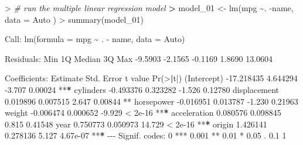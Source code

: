 \documentclass[
]{article}
\newenvironment{Shaded}{\begin{snugshade}}{\end{snugshade}}
\newcommand{\AttributeTok}[1]{\textcolor[rgb]{0.77,0.63,0.00}{#1}}
\newcommand{\CommentTok}[1]{\textcolor[rgb]{0.56,0.35,0.01}{\textit{#1}}}
\newcommand{\DecValTok}[1]{\textcolor[rgb]{0.00,0.00,0.81}{#1}}
\newcommand{\ErrorTok}[1]{\textcolor[rgb]{0.64,0.00,0.00}{\textbf{#1}}}
\newcommand{\FloatTok}[1]{\textcolor[rgb]{0.00,0.00,0.81}{#1}}
\newcommand{\FunctionTok}[1]{\textcolor[rgb]{0.00,0.00,0.00}{#1}}
\newcommand{\NormalTok}[1]{#1}
\newcommand{\OtherTok}[1]{\textcolor[rgb]{0.56,0.35,0.01}{#1}}
\newcommand{\SpecialCharTok}[1]{\textcolor[rgb]{0.00,0.00,0.00}{#1}}
\newcommand{\StringTok}[1]{\textcolor[rgb]{0.31,0.60,0.02}{#1}}
\begin{document}
\begin{Shaded}
\begin{Highlighting}[]
\SpecialCharTok{\textgreater{}} \CommentTok{\# run the multiple linear regression model}
\ErrorTok{\textgreater{}}\NormalTok{ model\_01 }\OtherTok{\textless{}{-}} \FunctionTok{lm}\NormalTok{(mpg }\SpecialCharTok{\textasciitilde{}}\NormalTok{. }\SpecialCharTok{{-}}\NormalTok{name, }\AttributeTok{data =}\NormalTok{ Auto )}
\SpecialCharTok{\textgreater{}} \FunctionTok{summary}\NormalTok{(model\_01)}

\NormalTok{Call}\SpecialCharTok{:}
\FunctionTok{lm}\NormalTok{(}\AttributeTok{formula =}\NormalTok{ mpg }\SpecialCharTok{\textasciitilde{}}\NormalTok{ . }\SpecialCharTok{{-}}\NormalTok{ name, }\AttributeTok{data =}\NormalTok{ Auto)}

\NormalTok{Residuals}\SpecialCharTok{:}
\NormalTok{    Min      1Q  Median      3Q     Max }
\SpecialCharTok{{-}}\FloatTok{9.5903} \SpecialCharTok{{-}}\FloatTok{2.1565} \SpecialCharTok{{-}}\FloatTok{0.1169}  \FloatTok{1.8690} \FloatTok{13.0604} 

\NormalTok{Coefficients}\SpecialCharTok{:}
\NormalTok{               Estimate Std. Error t value }\FunctionTok{Pr}\NormalTok{(}\SpecialCharTok{\textgreater{}}\ErrorTok{|}\NormalTok{t}\SpecialCharTok{|}\NormalTok{)    }
\NormalTok{(Intercept)  }\SpecialCharTok{{-}}\FloatTok{17.218435}   \FloatTok{4.644294}  \SpecialCharTok{{-}}\FloatTok{3.707}  \FloatTok{0.00024} \SpecialCharTok{**}\ErrorTok{*}
\NormalTok{cylinders     }\SpecialCharTok{{-}}\FloatTok{0.493376}   \FloatTok{0.323282}  \SpecialCharTok{{-}}\FloatTok{1.526}  \FloatTok{0.12780}    
\NormalTok{displacement   }\FloatTok{0.019896}   \FloatTok{0.007515}   \FloatTok{2.647}  \FloatTok{0.00844} \SpecialCharTok{**} 
\NormalTok{horsepower    }\SpecialCharTok{{-}}\FloatTok{0.016951}   \FloatTok{0.013787}  \SpecialCharTok{{-}}\FloatTok{1.230}  \FloatTok{0.21963}    
\NormalTok{weight        }\SpecialCharTok{{-}}\FloatTok{0.006474}   \FloatTok{0.000652}  \SpecialCharTok{{-}}\FloatTok{9.929}  \SpecialCharTok{\textless{}} \FloatTok{2e{-}16} \SpecialCharTok{**}\ErrorTok{*}
\NormalTok{acceleration   }\FloatTok{0.080576}   \FloatTok{0.098845}   \FloatTok{0.815}  \FloatTok{0.41548}    
\NormalTok{year           }\FloatTok{0.750773}   \FloatTok{0.050973}  \FloatTok{14.729}  \SpecialCharTok{\textless{}} \FloatTok{2e{-}16} \SpecialCharTok{**}\ErrorTok{*}
\NormalTok{origin         }\FloatTok{1.426141}   \FloatTok{0.278136}   \FloatTok{5.127} \FloatTok{4.67e{-}07} \SpecialCharTok{**}\ErrorTok{*}
\SpecialCharTok{{-}{-}{-}}
\NormalTok{Signif. codes}\SpecialCharTok{:}  \DecValTok{0} \StringTok{\textquotesingle{}***\textquotesingle{}} \FloatTok{0.001} \StringTok{\textquotesingle{}**\textquotesingle{}} \FloatTok{0.01} \StringTok{\textquotesingle{}*\textquotesingle{}} \FloatTok{0.05} \StringTok{\textquotesingle{}.\textquotesingle{}} \FloatTok{0.1} \StringTok{\textquotesingle{} \textquotesingle{}} \DecValTok{1}


\end{Highlighting}
\end{Shaded}
\end{document}
